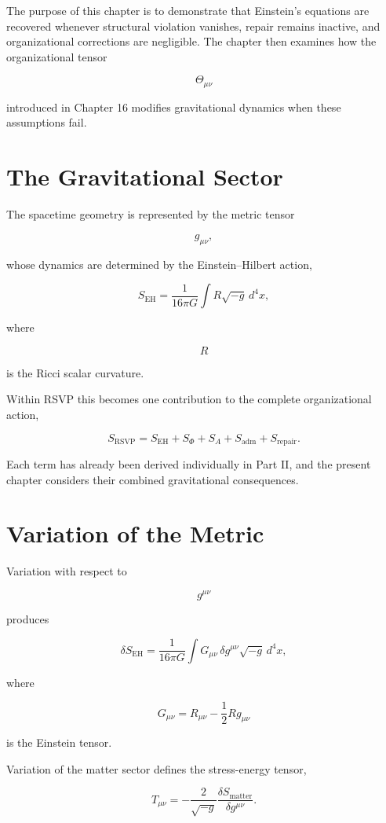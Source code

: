 \documentclass[11pt,oneside]{book}
\numberwithin{equation}{chapter}
\theoremstyle{definition}
\theoremstyle{plain}
\begin{document}
The purpose of this chapter is to demonstrate that Einstein's equations are
recovered whenever structural violation vanishes, repair remains inactive,
and organizational corrections are negligible. The chapter then examines how
the organizational tensor

\[
\Theta_{\mu\nu}
\]

introduced in Chapter 16 modifies gravitational dynamics when these
assumptions fail.

\section{The Gravitational Sector}

The spacetime geometry is represented by the metric tensor

\[
g_{\mu\nu},
\]

whose dynamics are determined by the Einstein--Hilbert action,

\[
S_{\mathrm{EH}}
=
\frac{1}{16\pi G}
\int
R
\sqrt{-g}\,
d^4x,
\]

where

\[
R
\]

is the Ricci scalar curvature.

Within RSVP this becomes one contribution to the complete organizational
action,

\[
S_{\mathrm{RSVP}}
=
S_{\mathrm{EH}}
+
S_{\Phi}
+
S_A
+
S_{\mathrm{adm}}
+
S_{\mathrm{repair}}.
\]

Each term has already been derived individually in Part II, and the present chapter considers their combined gravitational consequences.

\section{Variation of the Metric}

Variation with respect to

\[
g^{\mu\nu}
\]

produces

\[
\delta
S_{\mathrm{EH}}
=
\frac{1}{16\pi G}
\int
G_{\mu\nu}
\,
\delta g^{\mu\nu}
\sqrt{-g}\,
d^4x,
\]

where

\[
G_{\mu\nu}
=
R_{\mu\nu}
-
\frac12
Rg_{\mu\nu}
\]

is the Einstein tensor.

Variation of the matter sector defines the stress-energy tensor,

\[
T_{\mu\nu}
=
-
\frac{2}{\sqrt{-g}}
\frac{\delta S_{\mathrm{matter}}}
{\delta g^{\mu\nu}}.
\]
\end{document}
